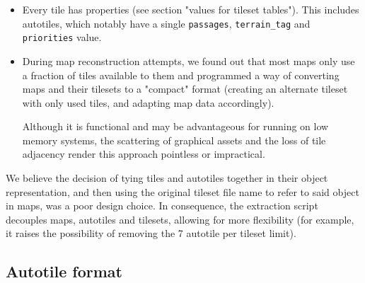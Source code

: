 \documentclass[11pt]{article}
\begin{document}
{\begin{itemize}
	This property is generated at the moment of placing the autotiles by automatically determining the right index for each, and therefore is an artifact of the map editor.
	
	Two formats were identified (\textit{frames are situated side-by-side horizontally}) :
	\begin{itemize}
		\item $3N \times 4$ : a 3 tile horizontal, 4 tile vertical, $N$ frame image. This is the official autotile format for RPG Maker XP.
		
		\item $N \times 1$ : a 1 tile horizontal, 1 tile vertical, $N$ frame image. This is used for animated individual tiles.
	\end{itemize}

	Animation is produced by iterating over frames of an autotile each time the screen is drawn.
	
	\item Every tile has properties (see section "values for tileset tables"). This includes autotiles, which notably have a single \verb|passages|, \verb|terrain_tag| and \verb|priorities| value.
	
	\item During map reconstruction attempts, we found out that most maps only use a fraction of tiles available to them and programmed a way of converting maps and their tilesets to a "compact" format (creating an alternate tileset with only used tiles, and adapting map data accordingly).
	
	Although it is functional and may be advantageous for running on low memory systems, the scattering of graphical assets and the loss of tile adjacency render this approach pointless or impractical. 
\end{itemize}


We believe the decision of tying tiles and autotiles together in their object representation, and then using the original tileset file name to refer to said object in maps, was a poor design choice. In consequence, the extraction script decouples maps, autotiles and tilesets, allowing for more flexibility (for example, it raises the possibility of removing the 7 autotile per tileset limit).



\subsection{Autotile format}

}
\end{document}
